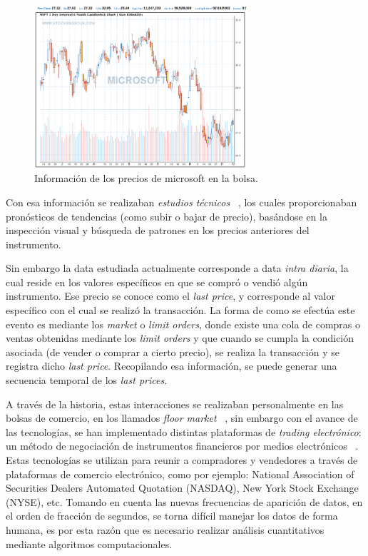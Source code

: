 \begin{figure}[h!t]
    \begin{center}
        \includegraphics[width=0.7\textwidth]{images/microsoft}
        \caption{Información de los precios de microsoft en la bolsa.}
        \label{fig:microsoft}
    \end{center}
\end{figure}

Con esa información se realizaban \emph{estudios técnicos}
~\cite{taylor1992use}, los cuales proporcionaban pronósticos de tendencias (como
subir o bajar de precio), basándose en la inspección visual y búsqueda de
patrones en los precios anteriores del instrumento. 

Sin embargo la data estudiada actualmente corresponde a data \emph{intra
diaria}, la cual reside en los valores específicos en que se compró o vendió
algún instrumento.  Ese precio se conoce como el \emph{last price}, y
corresponde al valor específico con el cual se realizó la transacción. La forma
de como se efectúa este evento es mediante los \emph{market} o \emph{limit
orders}, donde existe una cola de compras o ventas obtenidas mediante los
\emph{limit orders} y que cuando se cumpla la condición asociada (de vender o
comprar a cierto precio), se realiza la transacción y se registra dicho
\emph{last price}. Recopilando esa información, se puede generar una secuencia
temporal de los \emph{last prices}. 

A través de la historia, estas interacciones se realizaban personalmente en las
bolsas de comercio, en los llamados \emph{floor market}
~\cite{jain2005financial}, sin embargo con el avance de las tecnologías, se han
implementado distintas plataformas de \emph{trading electrónico}: un método de
negociación de instrumentos financieros por medios electrónicos
~\cite{weston2002electronic}. Estas tecnologías se utilizan para reunir a
compradores y vendedores a través de plataformas de comercio electrónico, como
por ejemplo: National Association of Securities Dealers Automated Quotation
(NASDAQ), New York Stock Exchange (NYSE), etc. Tomando en cuenta las nuevas
frecuencias de aparición de datos, en el orden de fracción de segundos, se
torna difícil manejar los datos de forma humana, es por esta razón que es
necesario realizar análisis cuantitativos mediante algoritmos computacionales.

